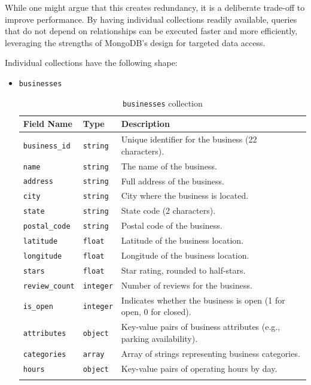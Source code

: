 \documentclass{Configuration_Files/PoliMi3i_thesis}
\begin{document}
While one might argue that this creates redundancy, it is a deliberate trade-off to improve performance. By having individual collections readily available, queries that do not depend on relationships can be executed faster and more efficiently, leveraging the strengths of MongoDB's design for targeted data access.

Individual collections have the following shape:
\begin{itemize}

\item{\texttt{businesses}}
\begin{longtable}{|p{3cm}|p{2.5cm}|p{10cm}|}
\hline
\textbf{Field Name} & \textbf{Type} & \textbf{Description} \\ \hline
\texttt{business\_id} & \texttt{string} & Unique identifier for the business (22 characters). \\ \hline
\texttt{name} & \texttt{string} & The name of the business. \\ \hline
\texttt{address} & \texttt{string} & Full address of the business. \\ \hline
\texttt{city} & \texttt{string} & City where the business is located. \\ \hline
\texttt{state} & \texttt{string} & State code (2 characters). \\ \hline
\texttt{postal\_code} & \texttt{string} & Postal code of the business. \\ \hline
\texttt{latitude} & \texttt{float} & Latitude of the business location. \\ \hline
\texttt{longitude} & \texttt{float} & Longitude of the business location. \\ \hline
\texttt{stars} & \texttt{float} & Star rating, rounded to half-stars. \\ \hline
\texttt{review\_count} & \texttt{integer} & Number of reviews for the business. \\ \hline
\texttt{is\_open} & \texttt{integer} & Indicates whether the business is open (1 for open, 0 for closed). \\ \hline
\texttt{attributes} & \texttt{object} & Key-value pairs of business attributes (e.g., parking availability). \\ \hline
\texttt{categories} & \texttt{array} & Array of strings representing business categories. \\ \hline
\texttt{hours} & \texttt{object} & Key-value pairs of operating hours by day. \\ \hline
\caption{\texttt{businesses} collection}
\end{longtable}


\end{itemize}
\end{document}
